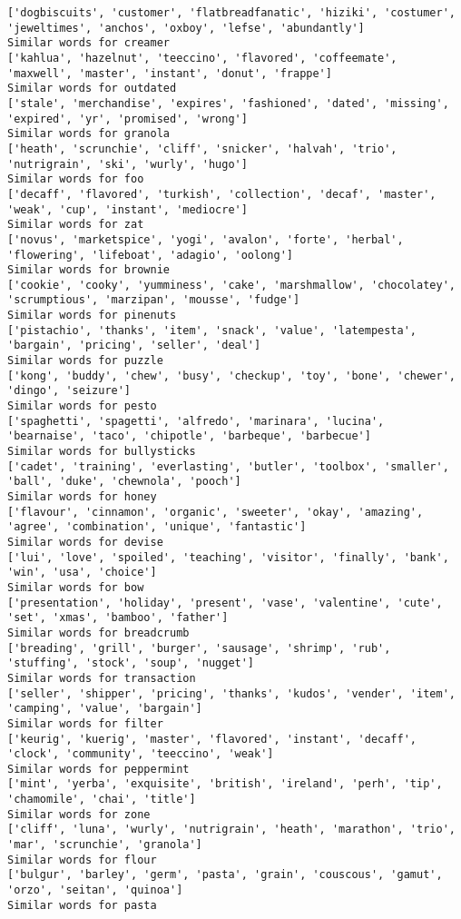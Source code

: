 \documentclass[11pt]{article}
\begin{document}
\begin{Verbatim}[commandchars=\\\{\}]
['dogbiscuits', 'customer', 'flatbreadfanatic', 'hiziki', 'costumer', 'jeweltimes', 'anchos', 'oxboy', 'lefse', 'abundantly']
Similar words for creamer
['kahlua', 'hazelnut', 'teeccino', 'flavored', 'coffeemate', 'maxwell', 'master', 'instant', 'donut', 'frappe']
Similar words for outdated
['stale', 'merchandise', 'expires', 'fashioned', 'dated', 'missing', 'expired', 'yr', 'promised', 'wrong']
Similar words for granola
['heath', 'scrunchie', 'cliff', 'snicker', 'halvah', 'trio', 'nutrigrain', 'ski', 'wurly', 'hugo']
Similar words for foo
['decaff', 'flavored', 'turkish', 'collection', 'decaf', 'master', 'weak', 'cup', 'instant', 'mediocre']
Similar words for zat
['novus', 'marketspice', 'yogi', 'avalon', 'forte', 'herbal', 'flowering', 'lifeboat', 'adagio', 'oolong']
Similar words for brownie
['cookie', 'cooky', 'yumminess', 'cake', 'marshmallow', 'chocolatey', 'scrumptious', 'marzipan', 'mousse', 'fudge']
Similar words for pinenuts
['pistachio', 'thanks', 'item', 'snack', 'value', 'latempesta', 'bargain', 'pricing', 'seller', 'deal']
Similar words for puzzle
['kong', 'buddy', 'chew', 'busy', 'checkup', 'toy', 'bone', 'chewer', 'dingo', 'seizure']
Similar words for pesto
['spaghetti', 'spagetti', 'alfredo', 'marinara', 'lucina', 'bearnaise', 'taco', 'chipotle', 'barbeque', 'barbecue']
Similar words for bullysticks
['cadet', 'training', 'everlasting', 'butler', 'toolbox', 'smaller', 'ball', 'duke', 'chewnola', 'pooch']
Similar words for honey
['flavour', 'cinnamon', 'organic', 'sweeter', 'okay', 'amazing', 'agree', 'combination', 'unique', 'fantastic']
Similar words for devise
['lui', 'love', 'spoiled', 'teaching', 'visitor', 'finally', 'bank', 'win', 'usa', 'choice']
Similar words for bow
['presentation', 'holiday', 'present', 'vase', 'valentine', 'cute', 'set', 'xmas', 'bamboo', 'father']
Similar words for breadcrumb
['breading', 'grill', 'burger', 'sausage', 'shrimp', 'rub', 'stuffing', 'stock', 'soup', 'nugget']
Similar words for transaction
['seller', 'shipper', 'pricing', 'thanks', 'kudos', 'vender', 'item', 'camping', 'value', 'bargain']
Similar words for filter
['keurig', 'kuerig', 'master', 'flavored', 'instant', 'decaff', 'clock', 'community', 'teeccino', 'weak']
Similar words for peppermint
['mint', 'yerba', 'exquisite', 'british', 'ireland', 'perh', 'tip', 'chamomile', 'chai', 'title']
Similar words for zone
['cliff', 'luna', 'wurly', 'nutrigrain', 'heath', 'marathon', 'trio', 'mar', 'scrunchie', 'granola']
Similar words for flour
['bulgur', 'barley', 'germ', 'pasta', 'grain', 'couscous', 'gamut', 'orzo', 'seitan', 'quinoa']
Similar words for pasta

\end{Verbatim}
\end{document}
